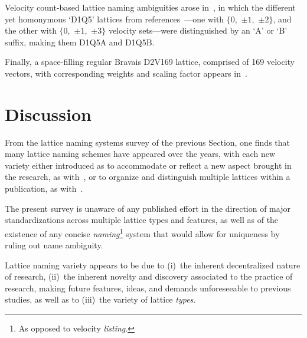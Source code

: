     Velocity count-based lattice naming ambiguities arose in~\cite{2017-PengY+ZhangJM-MathProblEng}, in which the different  yet
    homonymous            `D1Q5'            lattices            from            references~\cite{1998-QianYH+ZhouY-EuroPhysLett,
    2006-ChikatamarlaSS+KarlinIV-PhysRevLett}---one with $\{0,$ $\pm 1,$ $\pm 2\}$, and the other with $\{0,$ $\pm 1,$ $\pm 3\}$
    velocity sets---were distinguished by an `A' or `B' suffix, making them D1Q5A and D1Q5B.

    Finally, a space-filling regular Bravais D2V169 lattice, comprised of 169 velocity vectors, with corresponding  weights  and
    scaling factor appears in~\cite[p.~68]{2019-daRosaTG-MEngUTFPR}.


\section{Discussion}

    From the lattice naming systems survey of the previous Section, one finds that many lattice  naming  schemes  have  appeared
    over the years, with each new variety either introduced as to accommodate or reflect a new aspect brought in the research, as
    with~\cite{2006-ShanX+ChenH-JFluidMech,     2008-ChikatamarlaSS+KarlinIV-CompPhysComm,     2006-PhilippiPC+SurmasR-PhysRevE,
    2012-AmbrusVE+SofoneaV-PhysRevE, 2016-NamburiM+AnsumaliS-SciRep}, or to organize and distinguish multiple lattices within  a
    publication,        as        with~\cite{1991-QianYH+LallemandP-AdvKinTheoContMech,        2006-PhilippiPC+SurmasR-PhysRevE,
    2007-OrtizCEP-DrUFSC, 2014-MengJ+ZhangY-JComputPhys, 2017-LiL+KlausnerJF-IntJHeatMassTran}.

    The present survey is unaware of any published effort in the direction of major  standardizations  across  multiple  lattice
    types  and  features,  as  well  as  of  the  existence  of  any  concise  \emph{naming}\footnote{As  opposed  to   velocity
    \emph{listing}.} system that would allow for uniqueness by ruling out name ambiguity.

    Lattice naming variety appears to be due to (i)~the inherent decentralized nature of research, (ii)~the inherent novelty and
    discovery associated to the practice of research, making future features,  ideas,  and  demands  unforeseeable  to  previous
    studies, as well as to (iii)~the variety of lattice \emph{types}.


